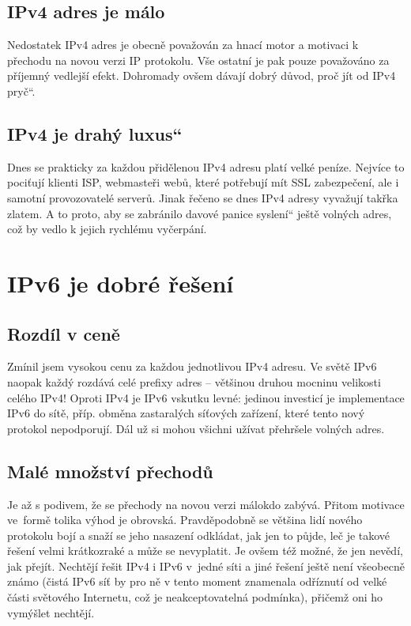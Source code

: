 \documentclass[12pt]{report}
\newcommand\uv[1]{\quotedblbase #1\textquotedblleft}
\begin{document}
\subsection{IPv4 adres je málo}
Nedostatek IPv4 adres je obecně považován za hnací motor a motivaci k přechodu na novou verzi IP protokolu. Vše ostatní je pak pouze považováno za příjemný vedlejší efekt. Dohromady ovšem dávají dobrý důvod, proč jít od IPv4 \uv{pryč}.

\subsection{IPv4 je drahý \uv{luxus}}
Dnes se prakticky za každou přidělenou IPv4 adresu platí velké peníze. Nejvíce to pociťují klienti ISP, webmasteři webů, které potřebují mít SSL zabezpečení, ale i samotní provozovatelé serverů. Jinak řečeno se dnes IPv4 adresy vyvažují takřka zlatem. A to proto, aby se zabránilo davové panice \uv{syslení} ještě volných adres, což by vedlo k jejich rychlému vyčerpání.

\section{IPv6 je dobré řešení}
\subsection{Rozdíl v ceně}
Zmínil jsem vysokou cenu za každou jednotlivou IPv4 adresu. Ve světě IPv6 naopak každý rozdává celé prefixy adres -- většinou druhou mocninu velikosti celého IPv4! 
Oproti IPv4 je IPv6 vskutku levné: jedinou investicí je implementace IPv6 do sítě, příp. obměna zastaralých síťových zařízení, které tento nový protokol nepodporují. Dál už si mohou všichni užívat přehršele volných adres.

\subsection{Malé množství přechodů}
Je až s podivem, že se přechody na novou verzi málokdo zabývá. Přitom motivace ve~formě tolika výhod je obrovská. Pravděpodobně se většina lidí nového protokolu bojí a snaží se jeho nasazení odkládat, jak jen to půjde, leč je takové řešení velmi krátkozraké a může se nevyplatit. Je ovšem též možné, že jen nevědí, jak přejít. Nechtějí řešit IPv4 i IPv6 v~jedné síti a jiné řešení ještě není všeobecně známo (čistá IPv6 síť by pro ně v tento moment znamenala odříznutí od velké části světového Internetu, což je neakceptovatelná podmínka), přičemž oni ho vymýšlet nechtějí.
\newpage{}
\end{document}

